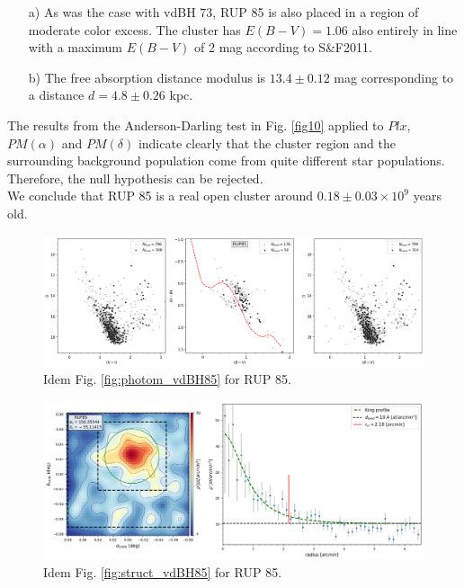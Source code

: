 \documentclass[referee]{aa}
\begin{document}
\begin{itemize}
\item [a)] As was the case with vdBH 73, RUP 85 is also placed
    in a region of moderate color excess. The cluster has $E(B-V)=1.06$
    also entirely in line with a maximum $E(B-V)$ of 2 mag according to
    S\&F2011.
\item [b)] The free absorption distance modulus is $13.4\pm0.12$ mag
corresponding to a distance $d=4.8\pm0.26$ kpc.
\end{itemize}

The results from the Anderson-Darling test in Fig. \ref{fig10} applied to $Plx$,
$PM(\alpha)$ and $PM(\delta)$ indicate clearly that the cluster region and the
surrounding background population come from quite different star populations.
Therefore, the null hypothesis can be rejected.\\

We conclude that RUP 85 is a real open cluster around $0.18\pm0.03\times10^9$
years old.

\begin{figure}[ht]
    \centering
    \includegraphics[width=\hsize]{../figs/obs_RUP85.png}
    \caption{Idem Fig. \ref{fig:photom_vdBH85} for RUP 85.}
    \label{fig7}
\end{figure}

\begin{figure}[ht]
    \centering
    \includegraphics[width=\hsize]{../figs/dmap_rup85.png}
    \caption{Idem Fig. \ref{fig:struct_vdBH85} for RUP 85.}
    \label{fig8}
\end{figure}
\end{document}
